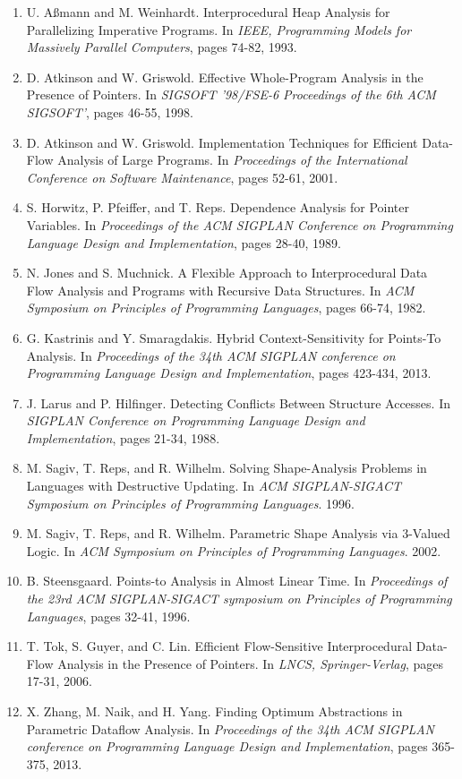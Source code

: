 \documentclass{article}
\begin{document}
\begin{enumerate}[1.]
    \item U. A{\ss}mann and M. Weinhardt. Interprocedural Heap Analysis for
        Parallelizing Imperative Programs. In \textit{IEEE, Programming
        Models for Massively Parallel Computers}, pages 74-82, 1993.
    \item D. Atkinson and W. Griswold. Effective Whole-Program Analysis in
        the Presence of Pointers. In \textit{SIGSOFT '98/FSE-6 Proceedings
        of the 6th ACM SIGSOFT'}, pages 46-55, 1998.
    \item D. Atkinson and W. Griswold. Implementation Techniques for
        Efficient Data-Flow Analysis of Large Programs. In
        \textit{Proceedings of the International Conference on Software
        Maintenance}, pages 52-61, 2001.
    \item S. Horwitz, P. Pfeiffer, and T. Reps. Dependence Analysis for
        Pointer Variables. In \textit{Proceedings of the ACM SIGPLAN 
        Conference on Programming Language Design and Implementation}, pages
        28-40, 1989.
    \item N. Jones and S. Muchnick. A Flexible Approach to Interprocedural
        Data Flow Analysis and Programs with Recursive Data Structures. In
        \textit{ACM Symposium on Principles of Programming Languages}, pages
        66-74, 1982.
    \item G. Kastrinis and Y. Smaragdakis. Hybrid Context-Sensitivity for
        Points-To Analysis. In \textit{Proceedings of the 34th ACM SIGPLAN
        conference on Programming Language Design and Implementation}, pages
        423-434, 2013.
    \item J. Larus and P. Hilfinger. Detecting Conflicts Between Structure
        Accesses. In \textit{SIGPLAN Conference on Programming Language
        Design and Implementation}, pages 21-34, 1988.
    \item M. Sagiv, T. Reps, and R. Wilhelm. Solving Shape-Analysis Problems
        in Languages with Destructive Updating. In \textit{ACM
        SIGPLAN-SIGACT Symposium on Principles of Programming Languages}.
        1996.
    \item M. Sagiv, T. Reps, and R. Wilhelm. Parametric Shape Analysis via
        3-Valued Logic. In \textit{ACM Symposium on Principles of
        Programming Languages}. 2002.
    \item B. Steensgaard. Points-to Analysis in Almost Linear Time. In
        \textit{Proceedings of the 23rd ACM SIGPLAN-SIGACT symposium on
        Principles of Programming Languages}, pages 32-41, 1996.
    \item T. Tok, S. Guyer, and C. Lin. Efficient Flow-Sensitive
        Interprocedural Data-Flow Analysis in the Presence of Pointers. In
        \textit{LNCS, Springer-Verlag}, pages 17-31, 2006.
    \item X. Zhang, M. Naik, and H. Yang. Finding Optimum Abstractions in
        Parametric Dataflow Analysis. In \textit{Proceedings of the 34th ACM
        SIGPLAN conference on Programming Language Design and
        Implementation}, pages 365-375, 2013.
\end{enumerate}
\end{document}
